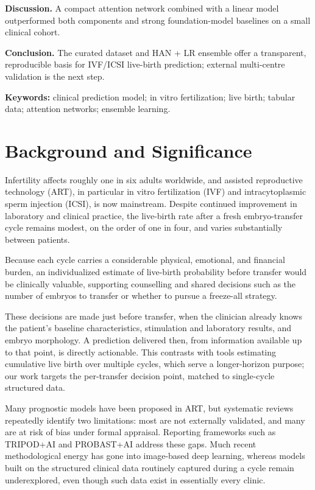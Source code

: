 \documentclass[12pt,a4paper]{article}
\begin{document}
\noindent\textbf{Discussion.} A compact attention network combined with a linear model outperformed both components and strong foundation-model baselines on a small clinical cohort.

\noindent\textbf{Conclusion.} The curated dataset and HAN + LR ensemble offer a transparent, reproducible basis for IVF/ICSI live-birth prediction; external multi-centre validation is the next step.

\vspace{0.6em}
\noindent\textbf{Keywords:} clinical prediction model; in vitro fertilization; live birth; tabular data; attention networks; ensemble learning.

\newpage

\section*{Background and Significance}

Infertility affects roughly one in six adults worldwide, and assisted reproductive technology (ART), in particular in vitro fertilization (IVF) and intracytoplasmic sperm injection (ICSI), is now mainstream.\cite{who,hfea} Despite continued improvement in laboratory and clinical practice, the live-birth rate after a fresh embryo-transfer cycle remains modest, on the order of one in four, and varies substantially between patients.\cite{hfea,zhu}

Because each cycle carries a considerable physical, emotional, and financial burden, an individualized estimate of live-birth probability before transfer would be clinically valuable, supporting counselling and shared decisions such as the number of embryos to transfer or whether to pursue a freeze-all strategy.\cite{stormlund,eshreEmb,asrmLimits}

These decisions are made just before transfer, when the clinician already knows the patient's baseline characteristics, stimulation and laboratory results, and embryo morphology. A prediction delivered then, from information available up to that point, is directly actionable. This contrasts with tools estimating cumulative live birth over multiple cycles,\cite{ratna} which serve a longer-horizon purpose; our work targets the per-transfer decision point, matched to single-cycle structured data.

Many prognostic models have been proposed in ART, but systematic reviews repeatedly identify two limitations: most are not externally validated, and many are at risk of bias under formal appraisal.\cite{henderson,ratna,andaur} Reporting frameworks such as TRIPOD+AI and PROBAST+AI address these gaps.\cite{tripod,probast} Much recent methodological energy has gone into image-based deep learning,\cite{mina,theilgaard,louis} whereas models built on the structured clinical data routinely captured during a cycle remain underexplored, even though such data exist in essentially every clinic.
\end{document}

